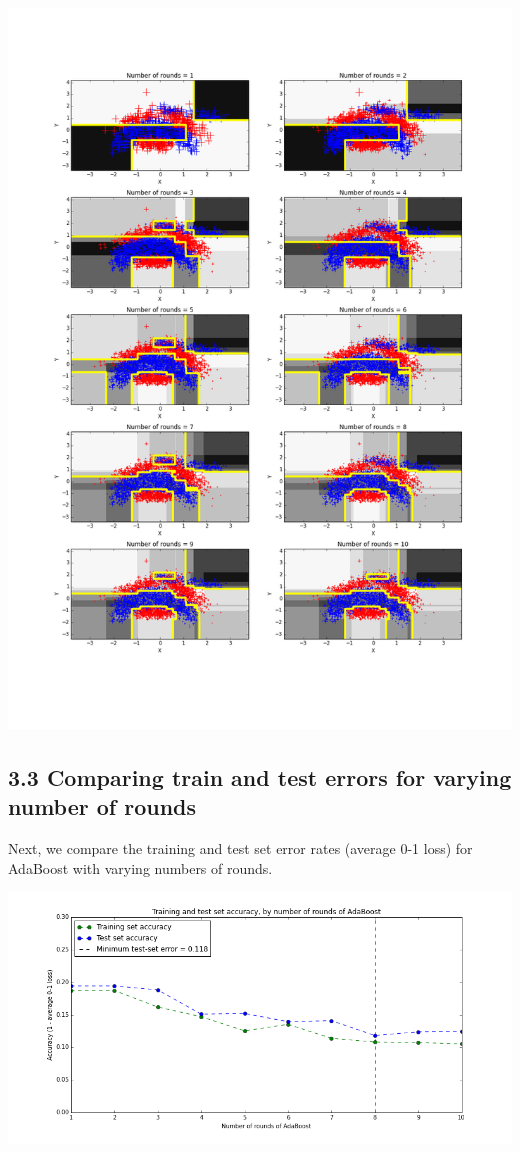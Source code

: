 \documentclass[paper=a4, fontsize=11pt]{scrartcl} %
\numberwithin{equation}{section} %
\numberwithin{figure}{section} %
\numberwithin{table}{section} %
\begin{document}
\includegraphics[scale=0.45]{./../figures/3_1_2.png}

\subsection*{3.3 Comparing train and test errors for varying number of rounds}

Next, we compare the training and test set error rates (average 0-1 loss) for AdaBoost with varying numbers of rounds.
\begin{center}
\includegraphics[scale=0.5]{./../figures/3_1_3.png}
\end{center}
\end{document}
